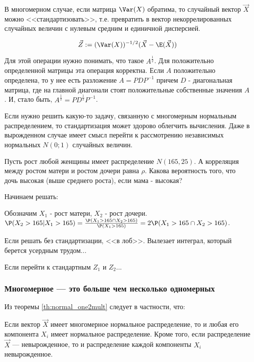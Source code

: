 В многомерном случае, если матрица $\Var(X)$ обратима, то случайный вектор $\vec{X}$ можно <<стандартизовать>>, т.е. превратить в вектор некоррелированных случайных величин с нулевым средним и единичной дисперсией.

\begin{equation}
\vec{Z}:=(\Var(X))^{-1/2}(\vec{X}-\E(\vec{X}))
\end{equation}

Для этой операции нужно понимать, что такое $A^{\frac{1}{2}}$. Для положительно определенной матрицы эта операция корректна. Если $A$ положительно определена, то у нее есть разложение $A=PDP^{-1}$ причем $D$ - диагональная матрица, где на главной диагонали стоят положительные собственные значения $A$. И, стало быть, $A^{\frac{1}{2}}=PD^{\frac{1}{2}}P^{-1}$.

Если нужно решить какую-то задачу, связанную с многомерным нормальным распределением, то стандартизация может здорово облегчить вычисления. Даже в вырожденном случае имеет смысл перейти к рассмотрению независимых нормальных $N(0;1)$ случайных величин.
\begin{myex}
Пусть рост любой женщины имеет распределение $N(165,25)$. А корреляция между ростом матери и ростом дочери равна $\rho$. Какова вероятность того, что дочь высокая (выше среднего роста), если мама - высокая?

Начинаем решать:

Обозначим $X_{1}$ - рост матери, $X_{2}$ - рост дочери. $\P(X_{2}>165|X_{1}>165)=\frac{\P(X_{1}>165\cap X_{2}>165)}{\P(X_{1}>165)}=2\P(X_{1}>165\cap X_{2}>165)$.

Если решать без стандартизации, <<в лоб>>. Вылезает интеграл, который берется усердным трудом...

Если перейти к стандартным $Z_{1}$ и $Z_{2}$...



\end{myex}


\subsubsection*{Многомерное --- это больше чем несколько одномерных}

Из теоремы \ref{th:normal_one2mult} следует в частности, что:

\begin{myth}
Если вектор $\vec{X}$ имеет многомерное нормальное распределение, то и любая его компонента $X_{i}$ имеет нормальное распределение. Кроме того, если распределение $\vec{X}$ --- невырожденное, то и распределение каждой компоненты $X_{i}$ невырожденное.
\end{myth}

